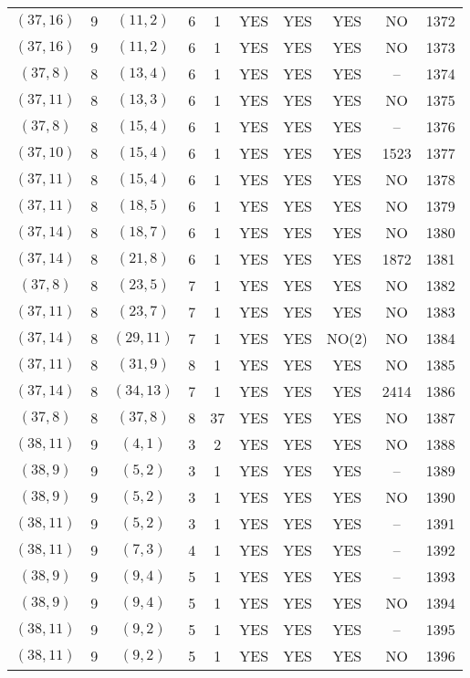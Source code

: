 \begin{longtable}{|c|c|c|c|c|c|c|c|c|c|}
$(37, 16)$ & 9 & $(11, 2)$ & 6 & 1 & YES & YES & YES & NO & 1372\\
$(37, 16)$ & 9 & $(11, 2)$ & 6 & 1 & YES & YES & YES & NO & 1373\\
$(37, 8)$ & 8 & $(13, 4)$ & 6 & 1 & YES & YES & YES & -- & 1374\\
$(37, 11)$ & 8 & $(13, 3)$ & 6 & 1 & YES & YES & YES & NO & 1375\\
$(37, 8)$ & 8 & $(15, 4)$ & 6 & 1 & YES & YES & YES & -- & 1376\\
$(37, 10)$ & 8 & $(15, 4)$ & 6 & 1 & YES & YES & YES & 1523 & 1377\\
$(37, 11)$ & 8 & $(15, 4)$ & 6 & 1 & YES & YES & YES & NO & 1378\\
$(37, 11)$ & 8 & $(18, 5)$ & 6 & 1 & YES & YES & YES & NO & 1379\\
$(37, 14)$ & 8 & $(18, 7)$ & 6 & 1 & YES & YES & YES & NO & 1380\\
$(37, 14)$ & 8 & $(21, 8)$ & 6 & 1 & YES & YES & YES & 1872 & 1381\\
$(37, 8)$ & 8 & $(23, 5)$ & 7 & 1 & YES & YES & YES & NO & 1382\\
$(37, 11)$ & 8 & $(23, 7)$ & 7 & 1 & YES & YES & YES & NO & 1383\\
$(37, 14)$ & 8 & $(29, 11)$ & 7 & 1 & YES & YES & NO(2) & NO & 1384\\
$(37, 11)$ & 8 & $(31, 9)$ & 8 & 1 & YES & YES & YES & NO & 1385\\
$(37, 14)$ & 8 & $(34, 13)$ & 7 & 1 & YES & YES & YES & 2414 & 1386\\
$(37, 8)$ & 8 & $(37, 8)$ & 8 & 37 & YES & YES & YES & NO & 1387\\
$(38, 11)$ & 9 & $(4, 1)$ & 3 & 2 & YES & YES & YES & NO & 1388\\
$(38, 9)$ & 9 & $(5, 2)$ & 3 & 1 & YES & YES & YES & -- & 1389\\
$(38, 9)$ & 9 & $(5, 2)$ & 3 & 1 & YES & YES & YES & NO & 1390\\
$(38, 11)$ & 9 & $(5, 2)$ & 3 & 1 & YES & YES & YES & -- & 1391\\
$(38, 11)$ & 9 & $(7, 3)$ & 4 & 1 & YES & YES & YES & -- & 1392\\
$(38, 9)$ & 9 & $(9, 4)$ & 5 & 1 & YES & YES & YES & -- & 1393\\
$(38, 9)$ & 9 & $(9, 4)$ & 5 & 1 & YES & YES & YES & NO & 1394\\
$(38, 11)$ & 9 & $(9, 2)$ & 5 & 1 & YES & YES & YES & -- & 1395\\
$(38, 11)$ & 9 & $(9, 2)$ & 5 & 1 & YES & YES & YES & NO & 1396\\

\end{longtable}
